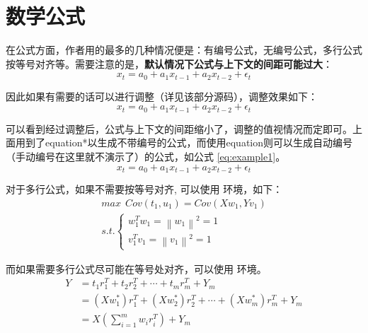 \documentclass[
    report,     %
    oneside,    %
    UTF8,       %
    zihao=-4    %
]{config} %
\begin{document}
\section{数学公式}

在公式方面，作者用的最多的几种情况便是：有编号公式，无编号公式，多行公式按等号对齐等。需要注意的是，\textbf{默认情况下公式与上下文的间距可能过大}：
\begin{equation*}
    x_t = a_0 + a_1x_{t-1} + a_2x_{t-2} + \epsilon_t
\end{equation*}

因此如果有需要的话可以进行调整（详见该部分源码），调整效果如下：
\abovedisplayshortskip=3pt
\belowdisplayshortskip=3pt
\abovedisplayskip=3pt
\belowdisplayskip=3pt
\begin{equation*}
    x_t = a_0 + a_1x_{t-1} + a_2x_{t-2} + \epsilon_t
\end{equation*}

可以看到经过调整后，公式与上下文的间距缩小了，调整的值视情况而定即可。上面用到了equation*以生成不带编号的公式，而使用equation则可以生成自动编号（手动编号在这里就不演示了）的公式，如公式 \eqref{eq:example1}。
\begin{equation}
    x_t = a_0 + a_1x_{t-1} + a_2x_{t-2} + \epsilon_t
    \label{eq:example1}
\end{equation}

对于多行公式，如果不需要按等号对齐, 可以使用  环境，如下：
\abovedisplayshortskip=3pt
\belowdisplayshortskip=4pt
\abovedisplayskip=3pt
\belowdisplayskip=4pt
\begin{gather*}%
max \ \ Cov(t_1,u_1) = Cov(Xw_1,Yv_1)\\
s.t.
\begin{cases}
  w_1^Tw_1 = \left \| w_1 \right \|^2 = 1  \\
  v_1^Tv_1 = \left \| v_1 \right \|^2 = 1  
\end{cases}
\end{gather*}

而如果需要多行公式尽可能在等号处对齐，可以使用  环境。
\abovedisplayshortskip=4pt
\belowdisplayshortskip=4pt
\abovedisplayskip=4pt
\belowdisplayskip=4pt
\begin{align}
Y &= t_1r_1^T + t_2r_2^T + \cdots + t_mr_m^T + Y_m \\
  &= (Xw_1^*)r_1^T + (Xw_2^*)r_2^T + \cdots + (Xw_m^*)r_m^T + Y_m \\
  &= X ({\textstyle \sum_{i=1}^{m}} w_ir_i^T) + Y_m
\end{align}
\end{document}
